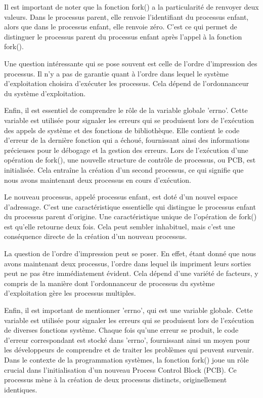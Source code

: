 \documentclass[12pt]{article}
\begin{document}
Il est important de noter que la fonction fork() a la particularité de renvoyer deux valeurs. Dans le processus parent, elle renvoie l'identifiant du processus enfant, alors que dans le processus enfant, elle renvoie zéro. C'est ce qui permet de distinguer le processus parent du processus enfant après l'appel à la fonction fork().

Une question intéressante qui se pose souvent est celle de l'ordre d'impression des processus. Il n'y a pas de garantie quant à l'ordre dans lequel le système d'exploitation choisira d'exécuter les processus. Cela dépend de l'ordonnanceur du système d'exploitation.

Enfin, il est essentiel de comprendre le rôle de la variable globale 'errno'. Cette variable est utilisée pour signaler les erreurs qui se produisent lors de l'exécution des appels de système et des fonctions de bibliothèque. Elle contient le code d'erreur de la dernière fonction qui a échoué, fournissant ainsi des informations précieuses pour le débogage et la gestion des erreurs.
Lors de l'exécution d'une opération de fork(), une nouvelle structure de contrôle de processus, ou PCB, est initialisée. Cela entraîne la création d'un second processus, ce qui signifie que nous avons maintenant deux processus en cours d'exécution. 

Le nouveau processus, appelé processus enfant, est doté d'un nouvel espace d'adressage. C'est une caractéristique essentielle qui distingue le processus enfant du processus parent d'origine. Une caractéristique unique de l'opération de fork() est qu'elle retourne deux fois. Cela peut sembler inhabituel, mais c'est une conséquence directe de la création d'un nouveau processus. 

La question de l'ordre d'impression peut se poser. En effet, étant donné que nous avons maintenant deux processus, l'ordre dans lequel ils impriment leurs sorties peut ne pas être immédiatement évident. Cela dépend d'une variété de facteurs, y compris de la manière dont l'ordonnanceur de processus du système d'exploitation gère les processus multiples. 

Enfin, il est important de mentionner 'errno', qui est une variable globale. Cette variable est utilisée pour signaler les erreurs qui se produisent lors de l'exécution de diverses fonctions système. Chaque fois qu'une erreur se produit, le code d'erreur correspondant est stocké dans 'errno', fournissant ainsi un moyen pour les développeurs de comprendre et de traiter les problèmes qui peuvent survenir.
Dans le contexte de la programmation systèmes, la fonction fork() joue un rôle crucial dans l'initialisation d'un nouveau Process Control Block (PCB). Ce processus mène à la création de deux processus distincts, originellement identiques. 
\end{document}
